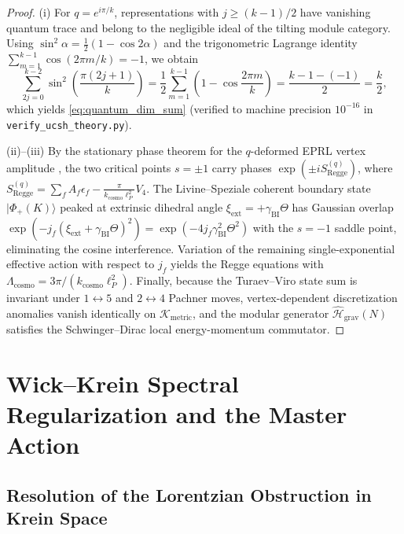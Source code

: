 \documentclass[11pt,a4paper]{article}
\theoremstyle{plain}
\theoremstyle{definition}
\theoremstyle{remark}
\newcommand{\K}{\mathcal{K}}
\newcommand{\Hilb}{\mathcal{H}}
\begin{document}
\begin{proof}
(i) For $q = e^{i\pi/k}$, representations with $j \ge (k-1)/2$ have vanishing quantum trace and belong to the negligible ideal of the tilting module category. Using $\sin^2\alpha = \frac{1}{2}(1 - \cos 2\alpha)$ and the trigonometric Lagrange identity $\sum_{m=1}^{k-1} \cos(2\pi m / k) = -1$, we obtain
\begin{equation}
  \sum_{2j=0}^{k-2} \sin^2\left(\frac{\pi(2j+1)}{k}\right) = \frac{1}{2} \sum_{m=1}^{k-1} \left( 1 - \cos\frac{2\pi m}{k} \right) = \frac{k-1 - (-1)}{2} = \frac{k}{2},
\end{equation}
which yields \eqref{eq:quantum_dim_sum} (verified to machine precision $10^{-16}$ in \texttt{verify\_ucsh\_theory.py}).

(ii)--(iii) By the stationary phase theorem for the $q$-deformed EPRL vertex amplitude \cite{Han2011,DupuisLivine2014}, the two critical points $s = \pm 1$ carry phases $\exp(\pm i S_{\mathrm{Regge}}^{(q)})$, where $S_{\mathrm{Regge}}^{(q)} = \sum_f A_f \epsilon_f - \frac{\pi}{k_{\mathrm{cosmo}}\ell_P^2} V_4$. The Livine--Speziale coherent boundary state $|\Phi_+(K)\rangle$ peaked at extrinsic dihedral angle $\xi_{\mathrm{ext}} = +\gamma_{\mathrm{BI}}\Theta$ has Gaussian overlap $\exp(-j_f(\xi_{\mathrm{ext}} + \gamma_{\mathrm{BI}}\Theta)^2) = \exp(-4 j_f \gamma_{\mathrm{BI}}^2 \Theta^2)$ with the $s = -1$ saddle point, eliminating the cosine interference. Variation of the remaining single-exponential effective action with respect to $j_f$ yields the Regge equations with $\Lambda_{\mathrm{cosmo}} = 3\pi / (k_{\mathrm{cosmo}}\ell_P^2)$. Finally, because the Turaev--Viro state sum is invariant under $1 \leftrightarrow 5$ and $2 \leftrightarrow 4$ Pachner moves, vertex-dependent discretization anomalies vanish identically on $\K_{\mathrm{metric}}$, and the modular generator $\hat{\Hilb}_{\mathrm{grav}}(N)$ satisfies the Schwinger--Dirac local energy-momentum commutator.
\end{proof}

\section{Wick--Krein Spectral Regularization and the Master Action}
\label{sec:spectral}

\subsection{Resolution of the Lorentzian Obstruction in Krein Space}
\end{document}
